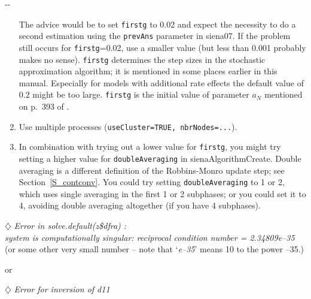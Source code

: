 \documentclass[a4paper,fleqn,11pt]{article}
\makeatletter
\newcommand{\+}{\, + \,}
\newcommand{\sfn}[1]{\textsf{#1}}
\newenvironment{indentation}[2]
{\par \setlength{\leftmargin}{#1}       \setlength{\rightmargin}{#2}
  \advance\linewidth -\leftmargin       \advance\linewidth -\rightmargin
  \advance\@totalleftmargin\leftmargin  \@setpar{{\@@par}}%
  \parshape 1 \@totalleftmargin         \linewidth \ignorespaces}{\par}
\makeatother
\begin{document}
\begin{indentation}{0.04\textwidth}{0pt}
\begin{enumerate}
   The advice would be to set  \texttt{firstg}  to 0.02
   and expect the necessity to do a second estimation using the \texttt{prevAns}
   parameter in \sfn{siena07}. If the problem still occurs for \texttt{firstg}=0.02,
   use a smaller value (but less than 0.001 probably makes no sense).
   \texttt{firstg} determines the step sizes in the stochastic approximation
   algorithm; it is mentioned in some places earlier in this manual.
   Especially for models with additional rate effects the default value of 0.2
   might be too large.
    \texttt{firstg}  is the initial value of parameter $a_N$ mentioned
    on p.\ 393 of \citet{Snijders01}.
\item Use multiple processes (\texttt{useCluster=TRUE, nbrNodes=...}).
\item In combination with trying out a lower value for \texttt{firstg},
    you might try setting a higher value for  \texttt{doubleAveraging}
    in \sfn{sienaAlgorithmCreate}. Double averaging is a different definition
    of the Robbins-Monro update step; see Section~\ref{S_contconv}.
    You could try setting  \texttt{doubleAveraging} to 1 or 2, which uses
    single averaging in the first 1 or 2 subphases; or you could set it to
    4, avoiding double averaging altogether (if you have 4 subphases).
\end{enumerate}
\end{indentation}
\bigskip

\noindent $\diamondsuit$
\emph{Error in solve.default(z\$dfra) : \\
system is computationally singular: reciprocal condition number = 2.34809e--35
}\\
(or some other very small number -- note that `\textit{e--35}' means 10 to the power
--35.)
\smallskip

or
\smallskip

\noindent $\diamondsuit$
\emph{Error for inversion of d11}
\smallskip
\end{document}
